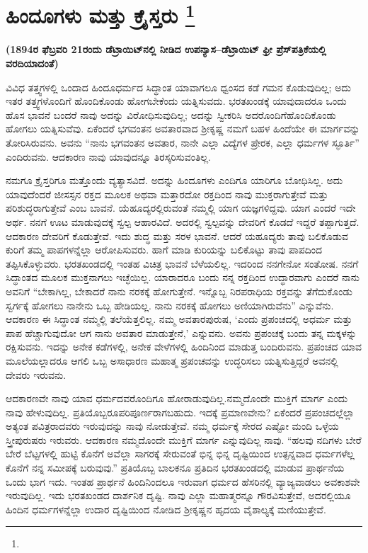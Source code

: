 
\chapter[ಹಿಂದೂಗಳು ಮತ್ತು ಕ್ರೈಸ್ತರು ]{ಹಿಂದೂಗಳು ಮತ್ತು ಕ್ರೈಸ್ತರು \protect\footnote{}}

\begin{center}
\textbf{(1894ರ ಫೆಬ್ರವರಿ 21ರಂದು ಡೆಟ್ರಾಯಿಟ್​ನಲ್ಲಿ ನೀಡಿದ ಉಪನ್ಯಾಸ–ಡೆಟ್ರಾಯಿಟ್​ ಫ್ರೀ ಪ್ರೆಸ್​ ಪತ್ರಿಕೆಯಲ್ಲಿ ವರದಿಯಾದಂತೆ)}
\end{center}

ವಿವಿಧ ತತ್ತ್ವಗಳಲ್ಲಿ ಒಂದಾದ ಹಿಂದೂಧರ್ಮದ ಸಿದ್ಧಾಂತ ಯಾವಾಗಲೂ ಧ್ವಂಸದ ಕಡೆ ಗಮನ ಕೊಡುವುದಿಲ್ಲ; ಅದು ಇತರ ತತ್ತ್ವಗಳೊಂದಿಗೆ ಹೊಂದಿಕೊಂಡು ಹೋಗಬೇಕೆಂದು ಯತ್ನಿಸುವದು. ಭರತಖಂಡಕ್ಕೆ ಯಾವುದಾದರೂ ಒಂದು ಹೊಸ ಭಾವನೆ ಬಂದರೆ ನಾವು ಅದನ್ನು ವಿರೋಧಿಸುವುದಿಲ್ಲ; ಅದನ್ನು ಸ್ವೀಕರಿಸಿ ಅದರೊಂದಿಗೆ\break ಹೊಂದಿಕೊಂಡು ಹೋಗಲು ಯತ್ನಿಸುವೆವು. ಏಕೆಂದರೆ ಭಗವಂತನ ಅವತಾರವಾದ ಶ‍್ರೀಕೃಷ್ಣ ನಮಗೆ ಬಹಳ ಹಿಂದೆಯೇ ಈ ಮಾರ್ಗವನ್ನು ತೋರಿಸಿರುವನು. ಅವನು “ನಾನು ಭಗವಂತನ ಅವತಾರ, ನಾನೇ ಎಲ್ಲಾ ವಿದ್ಯೆಗಳ ಪ್ರೇರಕ, ಎಲ್ಲಾ ಧರ್ಮಗಳ ಸ್ಫೂರ್ತಿ” ಎಂದಿರುವನು. ಆದಕಾರಣ ನಾವು ಯಾವುದನ್ನೂ ತಿರಸ್ಕರಿಸುವಂತಿಲ್ಲ.

ನಮಗೂ ಕ್ರೈಸ್ತರಿಗೂ ಮತ್ತೊಂದು ವ್ಯತ್ಯಾಸವಿದೆ. ಅದನ್ನು ಹಿಂದೂಗಳು ಎಂದಿಗೂ ಯಾರಿಗೂ ಬೋಧಿಸಿಲ್ಲ. ಅದು ಯಾವುದೆಂದರೆ ಜೀಸಸ್ಸನ ರಕ್ತದ ಮೂಲಕ ಅಥವಾ ಮತ್ತಾರದೋ ರಕ್ತದಿಂದ ನಾವು ಮುಕ್ತರಾಗುತ್ತೇವೆ ಮತ್ತು ಪರಿಶುದ್ಧರಾಗುತ್ತೇವೆ ಎಂಬ ಬಾವನೆ. ಯೆಹೂದ್ಯರಲ್ಲಿರುವಂತೆ ನಮ್ಮಲ್ಲಿ ಯಾಗ ಯಜ್ಞಗಳಿದ್ದವು. ಯಾಗ ಎಂದರೆ ಇದೇ ಅರ್ಥ. ನನಗೆ ಊಟ ಮಾಡುವುದಕ್ಕೆ ಸ್ವಲ್ಪ ಆಹಾರವಿದೆ. ಅದರಲ್ಲಿ ಸ್ವಲ್ಪವನ್ನು ದೇವರಿಗೆ ಕೊಡದೆ ಇದ್ದರೆ ತಪ್ಪಾಗುತ್ತದೆ. ಆದಕಾರಣ ದೇವರಿಗೆ ಕೊಡುತ್ತೇವೆ. ಇದು ಶುದ್ಧ ಮತ್ತು ಸರಳ ಭಾವನೆ. ಆದರೆ ಯಹೂದ್ಯರು ತಾವು ಬಲಿಕೊಡುವ ಕುರಿಗೆ ತಮ್ಮ ಪಾಪಗಳನ್ನೆಲ್ಲಾ ಆರೋಪಿಸುವರು. ಹಾಗೆ ಮಾಡಿ ಕುರಿಯನ್ನು ಬಲಿಕೊಟ್ಟು ತಾವು ಪಾಪದಿಂದ ತಪ್ಪಿಸಿಕೊಳ್ಳುವರು. ಭರತಖಂಡದಲ್ಲಿ ಇಂತಹ ವಿಚಿತ್ರ ಭಾವನೆ ಬೆಳೆಯಲಿಲ್ಲ. ಇದರಿಂದ ನನಗೇನೋ ಸಂತೋಷ. ನನಗೆ ಸಿದ್ಧಾಂತದ ಮೂಲಕ ಮುಕ್ತನಾಗಲು ಇಚ್ಛೆಯಿಲ್ಲ. ಯಾರಾದರೂ ಬಂದು ನನ್ನ ರಕ್ತದಿಂದ ಉದ್ಧಾರವಾಗು ಎಂದರೆ ನಾನು ಅವನಿಗೆ “ಬೇಕಾಗಿಲ್ಲ, ಬೇಕಾದರೆ ನಾನು ನರಕಕ್ಕೆ ಹೋಗುತ್ತೇನೆ. ಇನ್ನೊಬ್ಬ ನಿರಪರಾಧಿಯ ರಕ್ತವನ್ನು ತೆಗೆದುಕೊಂಡು ಸ್ವರ್ಗಕ್ಕೆ ಹೋಗಲು ನಾನೇನು ಒಬ್ಬ ಹೇಡಿಯಲ್ಲ. ನಾನು ನರಕಕ್ಕೆ ಹೋಗಲು ಅಣಿಯಾಗಿರುವೆನು” ಎನ್ನುವೆನು. ಆದಕಾರಣ ಈ ಸಿದ್ಧಾಂತ ನಮ್ಮಲ್ಲಿ ತಲೆಯೆತ್ತಲಿಲ್ಲ. ನಮ್ಮ ಅವತಾರಪುರುಷ, ‘ಎಂದು ಪ್ರಪಂಚದಲ್ಲಿ ಅಧರ್ಮ ಮತ್ತು ಪಾಪ ಹೆಚ್ಚಾಗುವುದೋ ಆಗ ನಾನು ಅವತಾರ ಮಾಡುತ್ತೇನೆ,’ ಎನ್ನುವನು. ಅವನು ಪ್ರಪಂಚಕ್ಕೆ ಬಂದು ತನ್ನ ಮಕ್ಕಳನ್ನು ರಕ್ಷಿಸುವನು. ಇದನ್ನು ಅನೇಕ ಕಡೆಗಳಲ್ಲಿ, ಅನೇಕ ವೇಳೆಗಳಲ್ಲಿ ಹಿಂದಿನಿಂದ ಮಾಡುತ್ತ ಬಂದಿರುವನು. ಪ್ರಪಂಚದ ಯಾವ ಮೂಲೆಯಲ್ಲಾದರೂ ಆಗಲಿ ಒಬ್ಬ ಅಸಾಧಾರಣ ಮಹಾತ್ಮ ಪ್ರಪಂಚವನ್ನು ಉದ್ಧರಿಸಲು ಯತ್ನಿಸುತ್ತಿದ್ದರೆ ಅವನಲ್ಲಿ ದೇವರು ಇರುವನು.

ಆದಕಾರಣವೇ ನಾವು ಯಾವ ಧರ್ಮದವರೊಂದಿಗೂ ಹೋರಾಡುವುದಿಲ್ಲ.\break ನಮ್ಮದೊಂದೇ ಮುಕ್ತಿಗೆ ಮಾರ್ಗ ಎಂದು ನಾವು ಹೇಳುವುದಿಲ್ಲ. ಪ್ರತಿಯೊಬ್ಬರೂ\break ಪರಿಪೂರ್ಣರಾಗಬಹುದು. ಇದಕ್ಕೆ ಪ್ರಮಾಣವೇನು? ಏಕೆಂದರೆ ಪ್ರಪಂಚದಲ್ಲೆಲ್ಲಾ ಅತ್ಯಂತ ಪವಿತ್ರರಾದವರು ಇರುವುದನ್ನು ನಾವು ನೋಡುತ್ತೇವೆ. ನಮ್ಮ ಧರ್ಮಕ್ಕೆ ಸೇರದ ಎಷ್ಟೋ ಮಂದಿ ಒಳ್ಳೆಯ ಸ್ತ್ರೀಪುರುಷರು ಇರುವರು. ಆದಕಾರಣ ನಮ್ಮದೊಂದೇ ಮುಕ್ತಿಗೆ ಮಾರ್ಗ ಎನ್ನುವುದಿಲ್ಲ ನಾವು. “ಹಲವು ನದಿಗಳು ಬೇರೆ ಬೇರೆ ಬೆಟ್ಟಗಳಲ್ಲಿ ಹುಟ್ಟಿ ಕೊನೆಗೆ ಅವೆಲ್ಲಾ ಸಾಗರಕ್ಕೆ ಸೇರುವಂತೆ ಭಿನ್ನ ಭಿನ್ನ ದೃಷ್ಟಿಯಿಂದ ಉತ್ಪನ್ನವಾದ ಧರ್ಮಗಳೆಲ್ಲ ಕೊನೆಗೆ ನನ್ನ ಸಮೀಪಕ್ಕೆ ಬರುವುವು.” ಪ್ರತಿಯೊಬ್ಬ ಬಾಲಕನೂ ಪ್ರತಿದಿನ ಭರತಖಂಡದಲ್ಲಿ ಮಾಡುವ ಪ್ರಾರ್ಥನೆಯ ಒಂದು ಭಾಗ ಇದು. ಇಂತಹ ಪ್ರಾರ್ಥನೆ ಹಿಂದಿನಿಂದಲೂ ಇರುವಾಗ ಧರ್ಮದ ಹೆಸರಿನಲ್ಲಿ ವ್ಯಾಜ್ಯವಾಡಲು ಅವಕಾಶವೇ ಇರುವುದಿಲ್ಲ. ಇದು ಭರತಖಂಡದ ದಾರ್ಶನಿಕ ದೃಷ್ಟಿ. ನಾವು ಎಲ್ಲಾ ಮಹಾತ್ಮರನ್ನೂ ಗೌರವಿಸುತ್ತೇವೆ, ಅದರಲ್ಲಿಯೂ ಹಿಂದಿನ ಧರ್ಮಗಳನ್ನೆಲ್ಲಾ ಉದಾರ ದೃಷ್ಟಿಯಿಂದ ನೋಡಿದ ಶ‍್ರೀಕೃಷ್ಣನ ಹೃದಯ ವೈಶಾಲ್ಯಕ್ಕೆ ಮಣಿಯುತ್ತೇವೆ.

